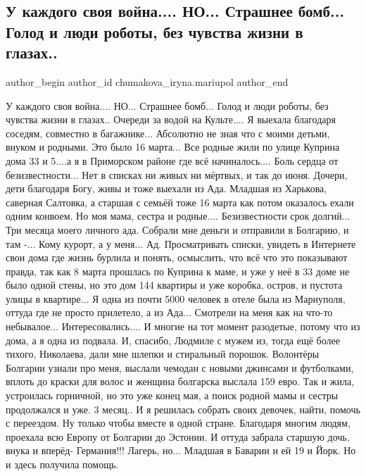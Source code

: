 
 
 
 
 

\subsection{У каждого своя война....  НО... Страшнее бомб... Голод и люди роботы, без чувства жизни в глазах..}
\label{sec:02_12_2022.fb.chumakova_iryna.mariupol.1.u_kazhdogo_svoya_voi}

\ifcmt
 author_begin
   author_id chumakova_iryna.mariupol
 author_end
\fi

У каждого своя война....  НО... Страшнее бомб... Голод и люди роботы, без
чувства жизни в глазах.. Очереди за водой на Культе.... Я выехала благодаря
соседям, совместно в багажнике... Абсолютно не зная что с моими детьми, внуком
и родными. Это было 16 марта... Все родные жили по улице Куприна дома 33 и
5....а я в Приморском районе где всё начиналось.... Боль сердца от
безизвестности... Нет в списках ни живых ни мёртвых, и так до  июня. Дочери,
дети благодаря Богу, живы и тоже выехали  из Ада. Младшая из Харькова, саверная
Салтовка, а старшая с семьёй тоже 16 марта как потом оказалось ехали одним
конвоем. Но моя мама, сестра и родные.... Безизвестности срок долгий...  Три
месяца моего личного ада. Собрали мне деньги и отправили в Болгарию, и там -...
Кому курорт, а у меня... Ад. Просматривать списки, увидеть в Интернете свои
дома где жизнь бурлила и понять, осмыслить, что всё что это показывают правда,
так как 8 марта прошлась по Куприна к маме, и уже у неё в 33 доме не было одной
стены, но это дом 144 квартиры и уже коробка, остров, и пустота улицы в
квартире...  Я одна из почти 5000 человек в отеле была из Мариуполя, оттуда где
не просто прилетело, а из Ада... Смотрели на меня  как на что-то небывалое...
Интересовались.... И многие на тот момент  разодетые, потому что из дома, а я
одна из подвала. И, спасибо, Людмиле с мужем из, тогда ещё более тихого,
Николаева, дали мне шлепки и стиральный порошок. Волонтёры Болгарии узнали про
меня, выслали чемодан с новыми джинсами и футболками, вплоть до краски для
волос и женщина болгарска выслала 159 евро. Так и жила, устроилась горничной,
но это уже конец мая, а поиск родной мамы и сестры продолжался и уже. 3 месяц..
И я решилась  собрать своих девочек, найти, помочь с переездом. Ну только чтобы
вместе в одной стране. Благодаря многим людям, проехала всю Европу от Болгарии
до Эстонии. И оттуда забрала старшую дочь, внука и вперёд- Германия!!! Лагерь,
но... Младшая  в Баварии и ей 19 и Йорк. Но и здесь получила помощь.

